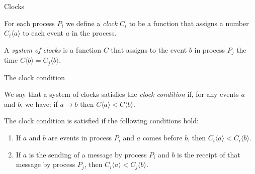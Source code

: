 \documentclass[12pt]{beamer}
\begin{document}
    \begin{frame}{Clocks}
        \begin{definition}[Clock]
            For each process \(P_i\) we define a \emph{clock} \(C_i\) to be a
            function that assigns a number \(C_i\langle a\rangle\) to
            each event \(a\) in the process.
        \end{definition}

        \begin{definition}
            A \emph{system of clocks} is a function \(C\) that assigns to the
            event \(b\) in process \(P_j\) the time \(C\langle b\rangle =
            C_j\langle b\rangle\).
        \end{definition}
    \end{frame}

    \begin{frame}{The clock condition}
        \begin{definition}
            We say that a system of clocks satisfies the \emph{clock condition}
            if, for any events \(a\) and \(b\), we have: if \(a\rightarrow b\)
            then \(C\langle a\rangle < C\langle b\rangle\).
        \end{definition}

        \begin{lemma}
            The clock condition is satisfied if the following conditions hold:
            \begin{enumerate}
                \item If \(a\) and \(b\) are events in process \(P_i\) and \(a\)
                comes before \(b\), then \(C_i\langle a\rangle < C_i\langle b\rangle\).
                \item If \(a\) is the sending of a message by process \(P_i\) and \(b\)
                is the receipt of that message by process \(P_j\), then
                \(C_i\langle a\rangle < C_j\langle b\rangle\).
            \end{enumerate}
        \end{lemma}
    \end{frame}
\end{document}
